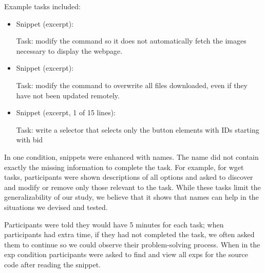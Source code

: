 \begin{changes}
Example tasks included:
\begin{itemize}

\item
Snippet (excerpt):


Task: modify the command so it does not automatically fetch the images necessary to display the webpage.

\item
Snippet (excerpt):


Task: modify the command to overwrite all files downloaded, even if they have not been updated remotely.

\item

Snippet (excerpt, 1 of 15 lines):


Task: write a selector that selects only the button elements with IDs starting with bid

\end{itemize}

In one condition, snippets were enhanced with \Glspl{name}.
The \gls{name} did not contain exactly the missing information to complete the task.
For example, for wget tasks, participants were shown descriptions of all options and asked to discover and modify or remove only those relevant to the task.
While these tasks limit the generalizability of our study, we believe that it shows that \Glspl{name} can help in the situations we devised and tested.
\end{changes}

Participants were told they would have 5 minutes for each task; when participants had extra time, if  they had not completed the task, we often asked them to continue so we could observe their problem-solving process. When in the \gls{exp} condition participants were asked to find and view all \glspl{exp} for the source code after reading the snippet.

